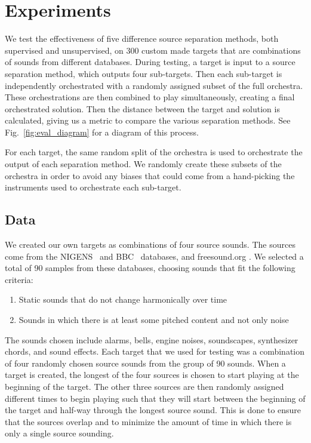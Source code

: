 \documentclass{article}
\begin{document}
\section{Experiments}\label{sec:experiments}
  
  We test the effectiveness of five difference source separation methods, both supervised and unsupervised, on 300 custom made targets that are combinations of sounds from different databases. During testing, a target is input to a source separation method, which outputs four sub-targets. Then each sub-target is independently orchestrated with a randomly assigned subset of the full orchestra. These orchestrations are then combined to play simultaneously, creating a final orchestrated solution. Then the distance between the target and solution is calculated, giving us a metric to compare the various separation methods. See Fig.~\ref{fig:eval_diagram} for a diagram of this process. 
  
  For each target, the same random split of the orchestra is used to orchestrate the output of each separation method. We randomly create these subsets of the orchestra in order to avoid any biases that could come from a hand-picking the instruments used to orchestrate each sub-target.  
  
    \subsection{Data}\label{subsec:data}
    We created our own targets as combinations of four source sounds. The sources come from the NIGENS~\cite{NIGENS} and BBC~\cite{BBC} databases, and freesound.org \cite{freesound}. We selected a total of 90 samples from these databases, choosing sounds that fit the following criteria: 
    
    \begin{enumerate}
    	\item Static sounds that do not change harmonically over time
    	\item Sounds in which there is at least some pitched content and not only noise
    \end{enumerate}     
    The sounds chosen include alarms, bells, engine noises, soundscapes, synthesizer chords, and sound effects. Each target that we used for testing was a combination of four randomly chosen source sounds from the group of 90 sounds. 
    When a target is created, the longest of the four sources is chosen to start playing at the beginning of the target. The other three sources are then randomly assigned different times to begin playing such that they will start between the beginning of the target and half-way through the longest source sound. This is done to ensure that the sources overlap and to minimize the amount of time in which there is only a single source sounding. 
    
\end{document}
